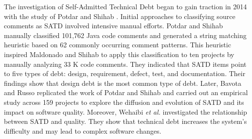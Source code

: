\documentclass[3p]{elsarticle}
\begin{document}
The investigation of Self-Admitted Technical Debt began to gain traction in 2014 with the study of Potdar and Shihab \cite{potdar2014exploratory}. Initial approaches to classifying source comments as SATD involved intensive manual efforts. Potdar and Shihab manually classified 101,762 Java code comments and generated a string matching heuristic based on 62 commonly occurring comment patterns. This heuristic inspired Maldonado and Shihab \cite{Maldonado2015} to apply this classification to ten projects by manually analyzing 33 K code comments. They indicated that SATD items point to five types of debt: design, requirement, defect, test, and documentation. Their findings show that design debt is the most common type of debt.  Later, Bavota and Russo \cite{bavota2016large} replicated the work of Potdar and Shihab and carried out an empirical study across 159 projects to explore the diffusion and evolution of SATD and its impact on software quality. Moreover, Wehaibi \textit{et al.} \cite{wehaibi2016examining} investigated the relationship between SATD and quality. They show that technical debt increases the system's difficulty and may lead to complex software changes.
\end{document}
